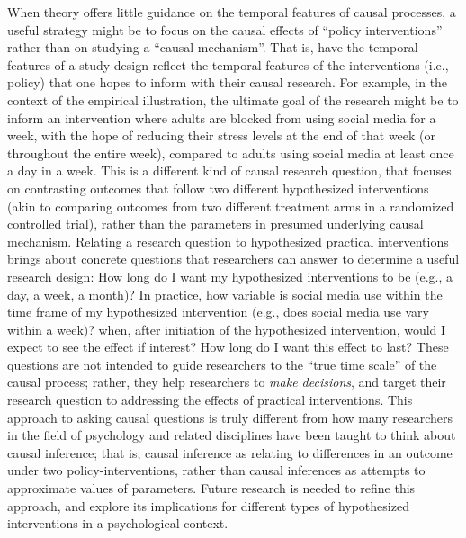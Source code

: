 \documentclass[man]{apa7} %
\begin{document}
When theory offers little guidance on the temporal features of causal processes, a useful strategy might be to focus on the causal effects of ``policy interventions'' rather than on studying a ``causal mechanism''. That is, have the temporal features of a study design reflect the temporal features of the interventions (i.e., policy) that one hopes to inform with their causal research. For example, in the context of the empirical illustration, the ultimate goal of the research might be to inform an intervention where adults are blocked from using social media for a week, with the hope of reducing their stress levels at the end of that week (or throughout the entire week), compared to adults using social media at least once a day in a week. This is a different kind of causal research question, that focuses on contrasting outcomes that follow two different hypothesized interventions (akin to comparing outcomes from two different treatment arms in a randomized controlled trial), rather than the parameters in presumed underlying causal mechanism. Relating a research question to hypothesized practical interventions brings about concrete questions that researchers can answer to determine a useful research design: How long do I want my hypothesized interventions to be (e.g., a day, a week, a month)? In practice, how variable is social media use within the time frame of my hypothesized intervention (e.g., does social media use vary within a week)? when, after initiation of the hypothesized intervention, would I expect to see the effect if interest? How long do I want this effect to last? These questions are not intended to guide researchers to the ``true time scale'' of the causal process; rather, they help researchers to \textit{make decisions}, and target their research question to addressing the effects of practical interventions. This approach to asking causal questions is truly different from how many researchers in the field of psychology and related disciplines have been taught to think about causal inference; that is, causal inference as relating to differences in an outcome under two policy-interventions, rather than causal inferences as attempts to approximate values of parameters. Future research is needed to refine this approach, and explore its implications for different types of hypothesized interventions in a psychological context. 
\end{document}

